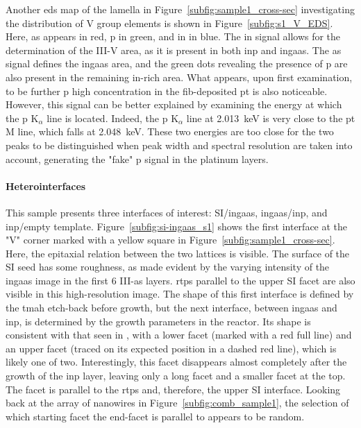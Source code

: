 Another \acs{eds} map of the lamella in Figure~\ref{subfig:sample1_cross-sec} investigating the distribution of V group elements is shown in Figure~\ref{subfig:s1_V_EDS}. Here, \acl{as} appears in red, \acl{p} in green, and \acl{in} in blue. The \acl{in} signal allows for the determination of the III-V area, as it is present in both \acs{inp} and \acs{ingaas}. The \acl{as} signal defines the \acs{ingaas} area, and the green dots revealing the presence of \acl{p} are also present in the remaining \acs{in}-rich area. What appears, upon first examination, to be further \acl{p} high concentration in the \acs{fib}-deposited \acl{pt} is also noticeable. However, this signal can be better explained by examining the energy at which the \acl{p} K\(_\alpha\) line is located. Indeed, the \acs{p} K\(_\alpha\) line at \qty{2.013}{\kilo\eV} is very close to the \acl{pt} M line, which falls at \qty{2.048}{\kilo\eV}. These two energies are too close for the two peaks to be distinguished when peak width and spectral resolution are taken into account, generating the "fake" \acl{p} signal in the platinum layers.
\par
\paragraph{Heterointerfaces}This sample presents three interfaces of interest: \acl{SI}/\acs{ingaas}, \acs{ingaas}/\acs{inp}, and \acs{inp}/empty template. Figure~\ref{subfig:si-ingaas_s1} shows the first interface at the "V" corner marked with a yellow square in Figure~\ref{subfig:sample1_cross-sec}. Here, the epitaxial relation between the two lattices is visible. The surface of the \acl{SI} seed has some roughness, as made evident by the varying intensity of the \acs{ingaas} image in the first \num{6} III-\acs{as} layers. \Acl{rtp}s parallel to the upper  \acl{SI} facet are also visible in this high-resolution image. The shape of this first interface is defined by the \acs{tmah} etch-back before growth, but the next interface, between \acs{ingaas} and \acs{inp}, is determined by the growth parameters in the reactor. Its shape is consistent with that seen in \cite{Scherrer2022, Borg2017, Borg2015}, with a lower  facet (marked with a red full line) and an upper  facet (traced on its expected position in a dashed red line), which is likely one of two. Interestingly, this  facet disappears almost completely after the growth of the \acs{inp} layer, leaving only a long  facet and a smaller  facet at the top. The  facet is parallel to the \acs{rtp}s and, therefore, the upper \acl{SI} interface. Looking back at the array of nanowires in Figure~\ref{subfig:comb_sample1}, the selection of which starting  facet the end-facet is parallel to appears to be random.
\par

